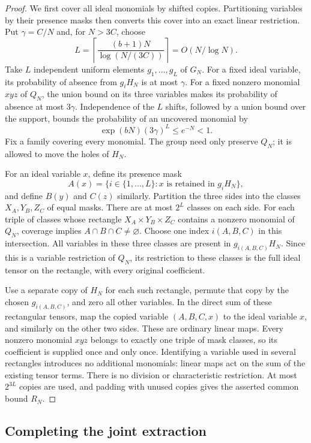 \begin{proof}
We first cover all ideal monomials by shifted copies.  Partitioning
variables by their presence masks then converts this cover into an exact
linear restriction.
Put $\gamma=C/N$ and, for $N>3C$, choose
\[
 L=\left\lceil\frac{(b+1)N}{\log(N/(3C))}\right\rceil
   =O(N/\log N).
\]
Take $L$ independent uniform elements $g_1,\ldots,g_L$ of $G_N$.
For a fixed ideal variable, its probability of absence from $g_iH_N$
is at most $\gamma$.  For a fixed nonzero monomial $xyz$ of $Q_N$,
the union bound on its three variables makes its probability of absence
at most $3\gamma$.  Independence of the $L$ shifts, followed by a
union bound over the support, bounds the probability of an uncovered
monomial by
\[
 \exp(bN)(3\gamma)^L\leq e^{-N}<1.
\]
Fix a family covering every monomial.  The group need only preserve
$Q_N$; it is allowed to move the holes of $H_N$.

For an ideal variable $x$, define its presence mask
\[
 A(x)=\{i\in\{1,\ldots,L\}:x\text{ is retained in }g_iH_N\},
\]
and define $B(y)$ and $C(z)$ similarly.  Partition the three sides
into the classes $X_A,Y_B,Z_C$ of equal masks.  There are at most
$2^L$ classes on each side.  For each triple of classes whose rectangle
$X_A\times Y_B\times Z_C$ contains a nonzero monomial of $Q_N$,
coverage implies $A\cap B\cap C\ne\varnothing$.  Choose one index
$i(A,B,C)$ in this intersection.  All variables in these three classes
are present in $g_{i(A,B,C)}H_N$.  Since this is a variable restriction
of $Q_N$, its restriction to these classes is the full ideal tensor
on the rectangle, with every original coefficient.

Use a separate copy of $H_N$ for each such rectangle, permute that
copy by the chosen $g_{i(A,B,C)}$, and zero all other variables.  In
the direct sum of these rectangular tensors, map the copied variable
$(A,B,C,x)$ to the ideal variable $x$, and similarly on the other two
sides.  These are ordinary linear maps.  Every nonzero monomial $xyz$
belongs to exactly one triple of mask classes, so its coefficient is
supplied once and only once.  Identifying a variable used in several
rectangles introduces no additional monomials: linear maps act on
the sum of the existing tensor terms.  There is no division or
characteristic restriction.  At most $2^{3L}$ copies are used, and
padding with unused copies gives the asserted common bound $R_N$.
\end{proof}

\subsection{Completing the joint extraction}\label{sec:recovery-completion}

